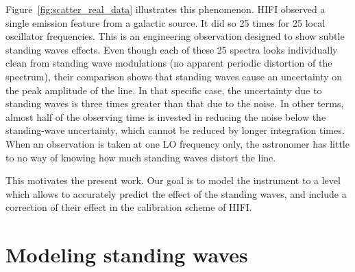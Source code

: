\documentclass[a4paper,11pt]{article}
\begin{document}
Figure~\ref{fig:scatter_real_data} illustrates this phenomenon.
HIFI observed a single emission feature from a galactic source.
It did so 25 times for 25 local oscillator frequencies.
This is an engineering observation designed to show subtle standing waves effects.
Even though each of these 25 spectra looks individually clean from standing wave modulations (no apparent periodic distortion of the spectrum), their comparison shows that standing waves cause an uncertainty on the peak amplitude of the line.
In that specific case, the uncertainty due to standing waves is three times greater than that due to the noise.
In other terms, almost half of the observing time is invested in reducing the noise below the standing-wave uncertainty, which cannot be reduced by longer integration times.
When an observation is taken at one LO frequency only, the astronomer has little to no way of knowing how much standing waves distort the line.

This motivates the present work.
Our goal is to model the instrument to a level which allows to accurately predict the effect of the standing waves, and include a correction of their effect in the calibration scheme of HIFI.






\section{Modeling standing waves}



\end{document}
